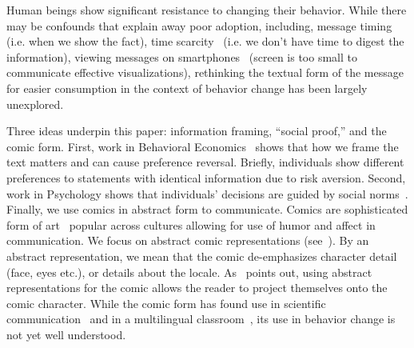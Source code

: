 Human beings show significant resistance to changing their behavior. While there may be confounds that explain away poor adoption, including, message timing~\cite{Fogg2009} (i.e. when we show the fact), time scarcity~\cite{Janssen2016} (i.e. we don't have time to digest the information), viewing messages on smartphones~\cite{Kim2016} (screen is too small to communicate effective visualizations), rethinking the textual form of the message for easier consumption in the context of behavior change has been largely unexplored.

Three ideas underpin this paper: information framing, ``social proof,'' and the comic form. First, work in Behavioral Economics~\cite{tversky1992advances,tversky1981framing} shows that how we frame the text matters and can cause preference reversal. Briefly, individuals show different preferences to statements with identical information due to risk aversion.
 Second, work in Psychology shows that individuals' decisions are guided by social norms~\cite{goldstein2008room,schultz2007constructive}. 
 Finally, we use comics in abstract form to communicate. Comics are sophisticated form of art~\cite{scott1993understanding} popular across cultures allowing for use of humor and affect in communication. We focus on abstract comic representations (see~). By an abstract representation, we mean that the comic de-emphasizes character detail (face, eyes etc.), or details about the locale. As~\textcite{scott1993understanding} points out, using abstract representations for the comic allows the reader to project themselves onto the comic character. 
While the comic form has found use in scientific communication~\cite{McDermottPB18} and in a multilingual classroom~\cite{cary2004going}, its use in behavior change is not yet well understood.

